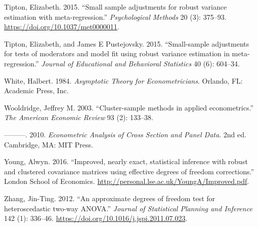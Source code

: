 \documentclass[12pt]{article}
\newlength{\cslhangindent}
\newlength{\cslentryspacingunit} %
\newenvironment{CSLReferences}[2] %
 {%
  \setlength{\parindent}{0pt}
  \ifodd #1
  \let\oldpar\par
  \def\par{\hangindent=\cslhangindent\oldpar}
  \fi
  \setlength{\parskip}{#2\cslentryspacingunit}
 }%
 {}
\begin{document}
\begin{CSLReferences}{1}{0}
\leavevmode{}%
Tipton, Elizabeth. 2015. {``{Small sample adjustments for robust
variance estimation with meta-regression.}''} \emph{Psychological
Methods} 20 (3): 375--93. \url{https://doi.org/10.1037/met0000011}.

\leavevmode{}%
Tipton, Elizabeth, and James E Pustejovsky. 2015. {``{Small-sample
adjustments for tests of moderators and model fit using robust variance
estimation in meta-regression}.''} \emph{Journal of Educational and
Behavioral Statistics} 40 (6): 604--34.

\leavevmode{}%
White, Halbert. 1984. \emph{Asymptotic Theory for Econometricians}.
Orlando, FL: Academic Press, Inc.

\leavevmode{}%
Wooldridge, Jeffrey M. 2003. {``{Cluster-sample methods in applied
econometrics}.''} \emph{The American Economic Review} 93 (2): 133--38.

\leavevmode{}%
---------. 2010. \emph{{Econometric Analysis of Cross Section and Panel
Data}}. 2nd ed. Cambridge, MA: MIT Press.

\leavevmode{}%
Young, Alwyn. 2016. {``{Improved, nearly exact, statistical inference
with robust and clustered covariance matrices using effective degrees of
freedom corrections}.''} London School of Economics.
\url{http://personal.lse.ac.uk/YoungA/Improved.pdf}.

\leavevmode{}%
Zhang, Jin-Ting. 2012. {``{An approximate degrees of freedom test for
heteroscedastic two-way ANOVA}.''} \emph{Journal of Statistical Planning
and Inference} 142 (1): 336--46.
\url{https://doi.org/10.1016/j.jspi.2011.07.023}.

\end{CSLReferences}



\end{document}
